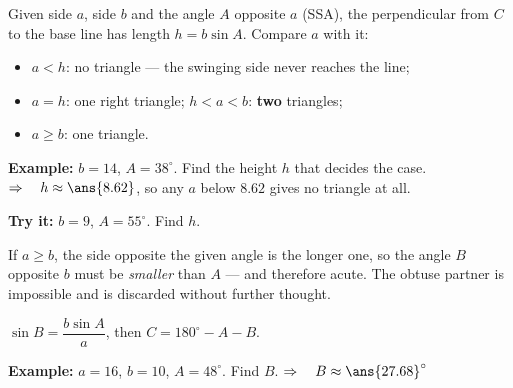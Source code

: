 \documentclass[12pt]{article}
\begin{document}


\begin{formulabox}
Given side $a$, side $b$ and the angle $A$ opposite $a$ (SSA), the perpendicular from $C$ to the base line has length $h = b\sin A$. Compare $a$ with it:\par
\begin{itemize}[leftmargin=0.9cm, itemsep=1pt, topsep=2pt]
  \item $a < h$: no triangle --- the swinging side never reaches the line;
  \item $a = h$: one right triangle; \quad $h < a < b$: \textbf{two} triangles;
  \item $a \ge b$: one triangle.
\end{itemize}
\end{formulabox}

\begin{examplebox}
\textbf{Example:} \quad $b = 14$, $A = 38^\circ$. Find the height $h$ that decides the case.
$\Rightarrow\quad h \approx \ans{8.62}$, so any $a$ below $8.62$ gives no triangle at all.
\end{examplebox}

\begin{tryitbox}
\textbf{Try it:} \quad $b = 9$, $A = 55^\circ$. Find $h$.\\[2pt]
\end{tryitbox}


\begin{formulabox}
If $a \ge b$, the side opposite the given angle is the longer one, so the angle $B$ opposite $b$ must be \emph{smaller} than $A$ --- and therefore acute. The obtuse partner is impossible and is discarded without further thought.\par
$\sin B = \dfrac{b\sin A}{a}$, then $C = 180^\circ - A - B$.
\end{formulabox}

\begin{examplebox}
\textbf{Example:} \quad $a = 16$, $b = 10$, $A = 48^\circ$. Find $B$.
$\Rightarrow\quad B \approx \ans{27.68}^\circ$
\end{examplebox}
\end{document}
